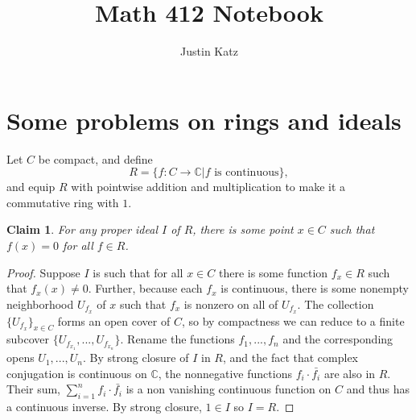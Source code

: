 \documentclass[18pt]{amsart}
\title{Math 412 Notebook}
\author{Justin Katz}
\newcommand{\C}{\mathbb{C}}
\newtheorem{claim}{Claim}
\begin{document}
\maketitle
\section{Some problems on rings and ideals}
 Let $C$ be compact, and define
	\begin{equation*}
		R=\{f:C \to \C | f\text{ is continuous}\},
	\end{equation*} 
and equip $R$ with pointwise addition and multiplication to make it a commutative ring with $1$.
	\begin{claim} 
		For any proper ideal $I$ of $R$, there is some point $x\in C$ such that $f(x)=0$ for all $f\in R$.
	\end{claim}
	\begin{proof}
		Suppose $I$ is such that for all $x \in C$ there is some function $f_x \in R$ such that $f_x(x) \neq 0$. Further, because each $f_x$ is continuous, there is some nonempty neighborhood $U_{f_x}$ of $x$ such that $f_x$ is nonzero on all of $U_{f_x}$. The collection $\{U_{f_x}\}_{x \in C}$ forms an open cover of $C$, so by compactness we can reduce to a finite subcover $\{U_{f_{x_1}},...,U_{f_{x_n}}\}$. Rename the functions $f_1,...,f_n$ and the corresponding opens $U_1,...,U_n$. By strong closure of $I$ in $R$, and the fact that complex conjugation is continuous on $\C$, the nonnegative functions $f_i \cdot \bar{f_i}$ are also in $R$. Their sum, $\sum_{i=1}^{n} f_i \cdot \bar{f_i}$ is a non vanishing continuous function on $C$ and thus has a continuous inverse. By strong closure, $1\in I$ so $I=R$.
	\end{proof}
\end{document}
